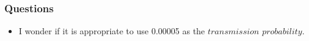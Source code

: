 \documentclass[aspectratio=169, 9pt, xcolor=table]{beamer}
\begin{document}
    

\begin{frame}
    \frametitle{Questions}
    
    \begin{itemize}
        \item I wonder if it is appropriate to use 0.00005 as the $\textit{transmission probability}$.
        
    \end{itemize}
\end{frame}
        

        
\end{document}
